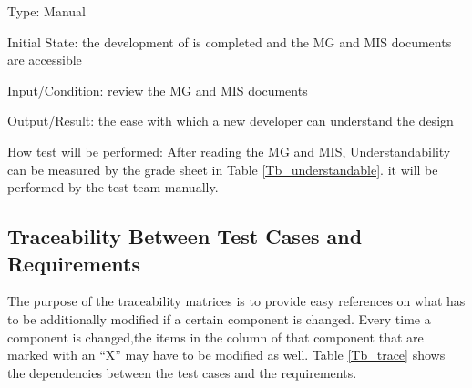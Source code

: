 \documentclass[12pt, titlepage]{article}
\begin{document}
\begin{enumerate}
Type: Manual
					
Initial State: the development of \progname{} is completed and the MG and MIS
documents are accessible
					
Input/Condition: review the MG and MIS documents
					
Output/Result: the ease
with which a new developer can understand the design
					
How test will be performed: After reading the MG and MIS, Understandability can
be measured by the grade sheet in Table \ref{Tb_understandable}. it will be
performed by the test team manually.

\end{enumerate}


\subsection{Traceability Between Test Cases and Requirements}

The purpose of the traceability matrices is to provide easy references on what
has to be additionally modified if a certain component is changed. Every time a
component is changed,the items in the column of that component that are marked
with an “X” may have to be modified as well. Table \ref{Tb_trace} shows the
dependencies between the test cases and the requirements.
\end{document}

